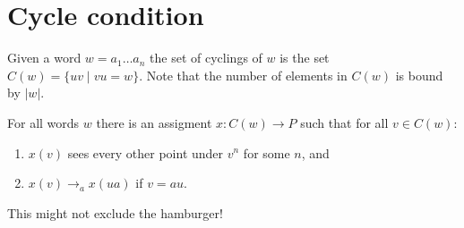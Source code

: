 \documentclass[a4paper]{article}
\begin{document}
\section{Cycle condition}

Given a word $w = a_1 \dots a_n$ the set of cyclings of $w$ is the set
$C(w) = \{uv \mid vu = w\}$. Note that the number of elements in $C(w)$
is bound by $|w|$.

For all words $w$ there is an assigment $x : C(w) \to P$ such that for
all $v \in C(w)$:
\begin{enumerate}
 \item $x(v)$ sees every other point under $v^n$ for some $n$, and
 \item $x(v) \rightarrow_a x(ua)$ if $v = au$.
\end{enumerate}

This might not exclude the hamburger!
\end{document}
